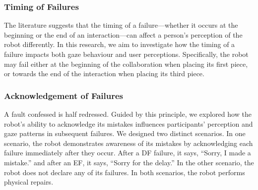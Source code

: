 \subsubsection{\textbf{Timing of Failures}}

The literature suggests that the timing of a failure—whether it occurs at the beginning or the end of an interaction—can affect a person’s perception of the robot differently. 
In this research, we aim to investigate how the timing of a failure impacts both gaze behaviour and user perceptions. Specifically, the robot may fail either at the beginning of the collaboration when placing its first piece, or towards the end of the interaction when placing its third piece.
 
\subsubsection{\textbf{Acknowledgement of Failures}}
A fault confessed is half redressed. Guided by this principle, we explored how the robot’s ability to acknowledge its mistakes influences participants’ perception and gaze patterns in subsequent failures. We designed two distinct scenarios. In one scenario, the robot demonstrates awareness of its mistakes by acknowledging each failure immediately after they occur. After a DF failure, it says, ``Sorry, I made a mistake.'' and after an EF, it says, ``Sorry for the delay.'' In the other scenario, the robot does not declare any of its failures.  In both scenarios, the robot performs physical repairs.
